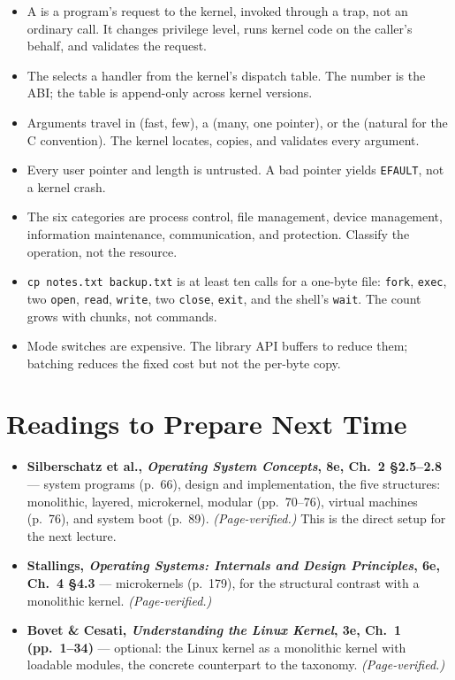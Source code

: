 \documentclass[11pt]{article}
\begin{document}
\begin{itemize}
  \item A  is a program's request to the kernel, invoked through a trap, not an ordinary call. It changes privilege level, runs kernel code on the caller's behalf, and validates the request.
  \item The  selects a handler from the kernel's dispatch table. The number is the ABI; the table is append-only across kernel versions.
  \item Arguments travel in  (fast, few), a  (many, one pointer), or the  (natural for the C convention). The kernel locates, copies, and validates every argument.
  \item Every user pointer and length is untrusted. A bad pointer yields \texttt{EFAULT}, not a kernel crash.
  \item The six categories are process control, file management, device management, information maintenance, communication, and protection. Classify the operation, not the resource.
  \item \texttt{cp notes.txt backup.txt} is at least ten calls for a one-byte file: \texttt{fork}, \texttt{exec}, two \texttt{open}, \texttt{read}, \texttt{write}, two \texttt{close}, \texttt{exit}, and the shell's \texttt{wait}. The count grows with chunks, not commands.
  \item Mode switches are expensive. The library API buffers to reduce them; batching reduces the fixed cost but not the per-byte copy.
\end{itemize}

\section{Readings to Prepare Next Time}

\begin{itemize}
  \item \textbf{Silberschatz et al., \emph{Operating System Concepts}, 8e, Ch.~2 \S2.5--2.8} --- system programs (p.~66), design and implementation, the five structures: monolithic, layered, microkernel, modular (pp.~70--76), virtual machines (p.~76), and system boot (p.~89). \emph{(Page-verified.)} This is the direct setup for the next lecture.
  \item \textbf{Stallings, \emph{Operating Systems: Internals and Design Principles}, 6e, Ch.~4 \S4.3} --- microkernels (p.~179), for the structural contrast with a monolithic kernel. \emph{(Page-verified.)}
  \item \textbf{Bovet \& Cesati, \emph{Understanding the Linux Kernel}, 3e, Ch.~1 (pp.~1--34)} --- optional: the Linux kernel as a monolithic kernel with loadable modules, the concrete counterpart to the taxonomy. \emph{(Page-verified.)}
\end{itemize}
\end{document}
